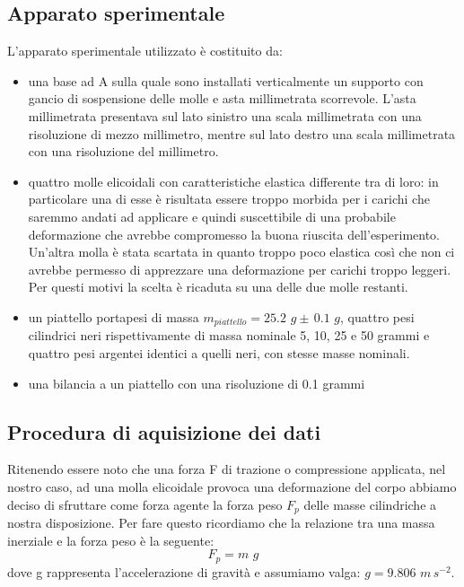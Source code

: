 \documentclass[11pt, twoside, a4paper]{article}
\begin{document}
\subsection{Apparato sperimentale}
L'apparato sperimentale utilizzato è costituito da:
	\begin{itemize}
		\item{una base ad A sulla quale sono installati verticalmente un supporto con gancio di sospensione delle molle e asta millimetrata scorrevole. L'asta millimetrata presentava sul lato sinistro una scala millimetrata con una risoluzione di mezzo millimetro, mentre sul lato destro una scala millimetrata con una risoluzione del millimetro.}
		\item{quattro molle elicoidali con caratteristiche elastica differente tra di loro: in particolare una di esse è risultata essere troppo morbida per i carichi che saremmo andati ad applicare e quindi suscettibile di una probabile deformazione che avrebbe compromesso la buona riuscita dell'esperimento. Un'altra molla è stata scartata in quanto troppo poco elastica così che non ci avrebbe permesso di apprezzare una deformazione per carichi troppo leggeri. Per questi motivi la scelta è ricaduta su una delle due molle restanti.}
		\item{un piattello portapesi di massa $m_{piattello} = 25.2\,\,g \pm\, 0.1\,\,g$, quattro pesi cilindrici neri rispettivamente di massa nominale 5, 10, 25 e 50 grammi e quattro pesi argentei identici a quelli neri, con stesse masse nominali.}
		\item{una bilancia a un piattello con una risoluzione di 0.1 grammi}
	\end{itemize}

\subsection{Procedura di aquisizione dei dati}
Ritenendo essere noto che una forza F di trazione o compressione applicata, nel nostro caso, ad una molla elicoidale provoca una deformazione del corpo abbiamo deciso di sfruttare come forza agente la forza peso $F_{p}$ delle masse cilindriche a nostra disposizione. Per fare questo ricordiamo che la relazione tra una massa inerziale e la forza peso è la seguente:
\begin{equation}
	F_{p} = m\,\,g
\end{equation}
dove g rappresenta l'accelerazione di gravità e assumiamo valga: $g = 9.806\,\,m\,s^{-2}$.
\end{document}
